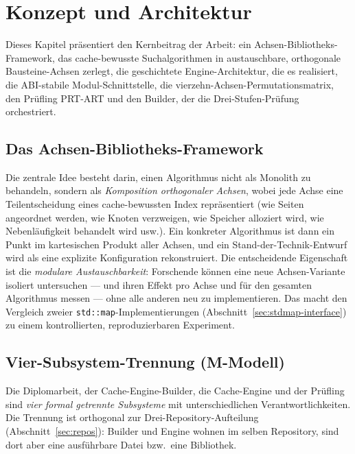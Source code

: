 \chapter{Konzept und Architektur}\label{ch:concept}

Dieses Kapitel präsentiert den Kernbeitrag der Arbeit: ein Achsen-Bibliotheks-Framework, das
cache-bewusste Suchalgorithmen in austauschbare, orthogonale Bausteine-Achsen zerlegt, die
geschichtete Engine-Architektur, die es realisiert, die ABI-stabile Modul-Schnittstelle, die
vierzehn-Achsen-Permutationsmatrix, den Prüfling PRT-ART und den Builder, der die
Drei-Stufen-Prüfung orchestriert.

\section{Das Achsen-Bibliotheks-Framework}\label{sec:axis-framework}

Die zentrale Idee besteht darin, einen Algorithmus nicht als Monolith zu behandeln, sondern
als \emph{Komposition orthogonaler Achsen}, wobei jede Achse eine Teilentscheidung eines
cache-bewussten Index repräsentiert (wie Seiten angeordnet werden, wie Knoten verzweigen, wie
Speicher alloziert wird, wie Nebenläufigkeit behandelt wird usw.). Ein konkreter Algorithmus
ist dann ein Punkt im kartesischen Produkt aller Achsen, und ein Stand-der-Technik-Entwurf
wird als eine explizite Konfiguration rekonstruiert. Die entscheidende Eigenschaft ist die
\emph{modulare Austauschbarkeit}: Forschende können eine neue Achsen-Variante isoliert
untersuchen --- und ihren Effekt pro Achse und für den gesamten Algorithmus messen --- ohne
alle anderen neu zu implementieren. Das macht den Vergleich zweier
\texttt{std::map}-Implementierungen (Abschnitt~\ref{sec:stdmap-interface}) zu einem
kontrollierten, reproduzierbaren Experiment.

\section{Vier-Subsystem-Trennung (M-Modell)}\label{sec:m-model}

Die Diplomarbeit, der Cache-Engine-Builder, die Cache-Engine und der Prüfling sind
\emph{vier formal getrennte Subsysteme} mit unterschiedlichen Verantwortlichkeiten. Die
Trennung ist orthogonal zur Drei-Repository-Aufteilung (Abschnitt~\ref{sec:repos}): Builder
und Engine wohnen im selben Repository, sind dort aber eine ausführbare Datei bzw.\ eine
Bibliothek.

